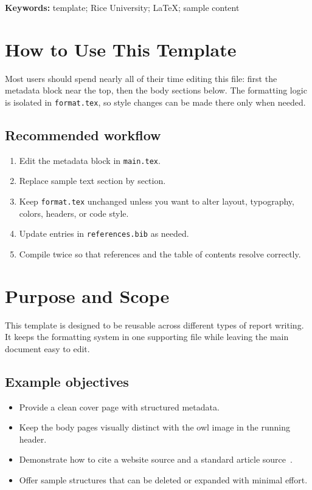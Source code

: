\documentclass[11pt,letterpaper]{article}
\begin{document}
\vspace{0.5em}
\textbf{Keywords:} template; Rice University; \LaTeX; sample content

\tableofcontents
\newpage

\section{How to Use This Template}

Most users should spend nearly all of their time editing this file: first the metadata block near the top, then the body sections below. The formatting logic is isolated in \texttt{format.tex}, so style changes can be made there only when needed.

\subsection{Recommended workflow}
\begin{enumerate}[leftmargin=1.5em,label=\arabic*.]
    \item Edit the metadata block in \texttt{main.tex}.
    \item Replace sample text section by section.
    \item Keep \texttt{format.tex} unchanged unless you want to alter layout, typography, colors, headers, or code style.
    \item Update entries in \texttt{references.bib} as needed.
    \item Compile twice so that references and the table of contents resolve correctly.
\end{enumerate}

\section{Purpose and Scope}

This template is designed to be reusable across different types of report writing. It keeps the formatting system in one supporting file while leaving the main document easy to edit.

\subsection{Example objectives}
\begin{itemize}[leftmargin=1.5em]
    \item Provide a clean cover page with structured metadata.
    \item Keep the body pages visually distinct with the owl image in the running header.
    \item Demonstrate how to cite a website source and a standard article source~\cite{ricebrandresources,samplemethod2024}.
    \item Offer sample structures that can be deleted or expanded with minimal effort.
\end{itemize}
\end{document}
